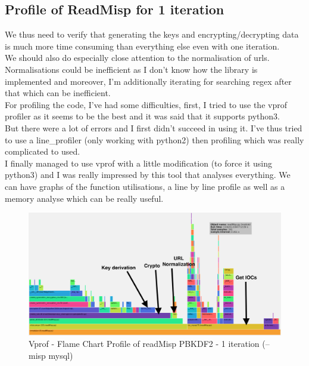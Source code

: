 \documentclass{eplmastersthesis}
\begin{document}
\subsection{Profile of ReadMisp for 1 iteration}
We thus need to verify that generating the keys and encrypting/decrypting data is much more time consuming than everything else even with one iteration.\\
We should also do especially close attention to the normalisation of \gls{url}s. Normalisations could be inefficient as I don't know how the library is implemented and moreover, I'm additionally iterating for searching regex after that which can be inefficient.\\

For profiling the code, I've had some difficulties, first, I tried to use the vprof profiler as it seems to be the best and it was said that it supports python3.\\
But there were a lot of errors and I first didn't succeed in using it. I've thus tried to use a line\_profiler (only working with python2) then profiling which was really complicated to used. \\
I finally managed to use vprof with a little modification (to force it using python3) and I was really impressed by this tool that analyses everything. We can have graphs of the function utilisations, a line by line profile as well as a memory analyse which can be really useful.\\

\begin{figure}[h!]
\begin{center}
	\includegraphics[scale=0.3]{res/profile-1iter}
	\caption{Vprof - Flame Chart Profile of readMisp PBKDF2 - 1 iteration (--misp mysql)}
	\label{profile-readMisp}
\end{center}
\end{figure}
\end{document}
